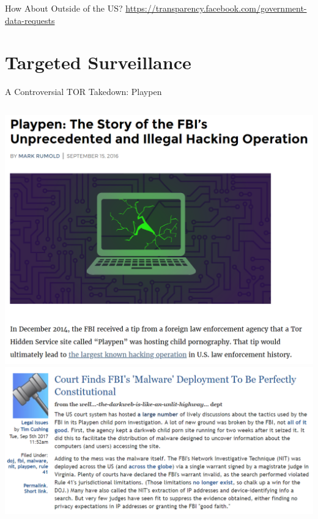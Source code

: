 \documentclass[nobackground,dvipsnames,table,aspectratio=169]{beamer}
\begin{document}
\begin{frame}{How About Outside of the US?}
    \tiny
    \url{https://transparency.facebook.com/government-data-requests}
\end{frame}

\section{Targeted Surveillance}

\begin{frame}{A Controversial TOR Takedown: Playpen}
    \begin{columns}
            \includegraphics[width=1.5\textwidth]{playpen-article}
            \includegraphics[width=\textwidth]{playpen-court-article}
    \end{columns}
\end{frame}
\end{document}
